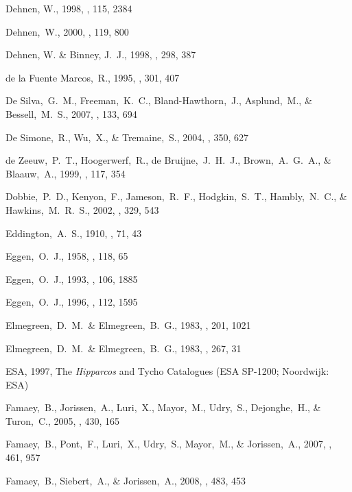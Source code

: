 \begin{thebibliography}{99}
{Dehnen}, W., 1998, \aj, 115, 2384

  Dehnen,~W., 2000,
  \aj, 119, 800

{Dehnen}, W. \& {Binney}, J.~J., 1998, \mnras, 298, 387

  de la Fuente Marcos,~R., 1995,
  \aap, 301, 407

  De Silva,~G.~M., Freeman,~K.~C., Bland-Hawthorn,~J., Asplund,~M., \& Bessell,~M.~S., 2007,
  \aj, 133, 694

  De Simone,~R., Wu,~X., \& Tremaine,~S., 2004,
  \mnras, 350, 627

  de Zeeuw,~P.~T., Hoogerwerf,~R., de Bruijne,~J.~H.~J., Brown,~A.~G.~A., \& Blaauw,~A., 1999,
  \aj, 117, 354

  Dobbie,~P.~D., Kenyon,~F., Jameson,~R.~F., Hodgkin,~S.~T., Hambly,~N.~C., \& Hawkins,~M.~R.~S., 2002,
  \mnras, 329, 543

  Eddington,~A.~S., 1910, \mnras, 71, 43

  Eggen,~O.~J., 1958,
  \mnras, 118, 65

  Eggen,~O.~J., 1993,
  \aj, 106, 1885

  Eggen,~O.~J., 1996,
  \aj, 112, 1595

  Elmegreen,~D.~M.~\& Elmegreen,~B.~G., 1983,
  \mnras, 201, 1021

  Elmegreen,~D.~M.~\& Elmegreen,~B.~G., 1983,
  \apj, 267, 31

{ESA}, 1997, {The \emph{Hipparcos} and Tycho Catalogues} (ESA SP-1200; Noordwijk: ESA)

  Famaey,~B., Jorissen,~A., Luri,~X., Mayor,~M., Udry,~S., Dejonghe,~H., \& Turon,~C., 2005, 
  \aap, 430, 165

  Famaey,~B., Pont,~F., Luri,~X., Udry,~S., Mayor,~M., \& Jorissen,~A., 2007,
  \aap, 461, 957

  Famaey,~B., Siebert,~A., \& Jorissen,~A., 2008,
  \aap, 483, 453


\end{thebibliography}
